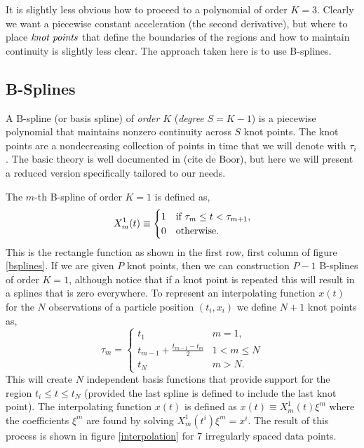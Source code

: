 \documentclass[twocol]{ametsoc}
\begin{document}
It is slightly less obvious how to proceed to a polynomial of order $K=3$. Clearly we want a piecewise constant acceleration (the second derivative), but where to place $\emph{knot points}$ that define the boundaries of the regions  and how to maintain continuity is slightly less clear. The approach taken here is to use B-splines.

\subsection{B-Splines}

A B-spline (or basis spline) of \emph{order} $K$ (\emph{degree} $S=K-1$) is a piecewise polynomial that maintains nonzero continuity across $S$ knot points. The knot points are a nondecreasing collection of points in time that we will denote with $\tau_i$. The basic theory is well documented in (cite de Boor), but here we will present a reduced version specifically tailored to our needs.

The $m$-th B-spline of order $K=1$ is defined as,
\begin{equation}
X^1_m(t) \equiv \begin{cases}
1      & \text{if $ \tau_m \leq t < \tau_{m+1}$}, \\
0     & \text{otherwise}.
\end{cases}
\end{equation}
This is the rectangle function as shown in the first row, first column of figure \ref{bsplines}. If we are given $P$ knot points, then we can construction $P-1$ B-splines of order $K=1$, although notice that if a knot point is repeated this will result in a splines that is zero everywhere. To represent an interpolating function $x(t)$ for the $N$ observations of a particle position $(t_i,x_i)$ we define $N+1$ knot points as,
\begin{equation}
\tau_m = \begin{cases}
t_1      & \text{$m=1$}, \\
t_{m-1} + \frac{t_{m-1}-t_m}{2}	  & \text{$1<m \leq N$}\\
t_N     & \text{$m>N$}.
\end{cases}
\end{equation}
This will create $N$ independent basis functions that provide support for the region $t_i \leq t \leq t_N$ (provided the last spline is defined to include the last knot point). The interpolating function $x(t)$ is defined as $x(t) \equiv  X^1_m(t) \xi^m$ where the coefficients $\xi^m$ are found by solving $X^1_m(t^i) \xi^m = x^i$. The result of this process is shown in figure \ref{interpolation} for 7 irregularly spaced data points.
\end{document}

